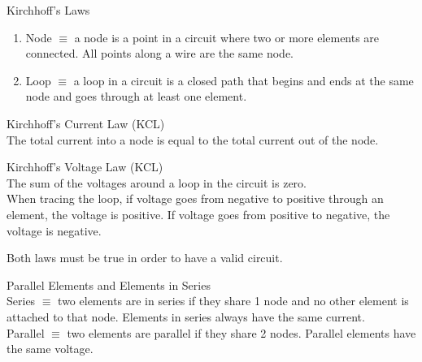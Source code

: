 \documentclass{article}
\begin{document}
\noindent
\Large
Kirchhoff's Laws\\
\normalsize
\noindent
\begin{enumerate}
  \item {
  Node $\equiv$ a node is a point in a circuit where two or more elements are connected. All points along a wire are the same node.
  }
  \item {
  Loop $\equiv$ a loop in a circuit is a closed path that begins and ends at the same node and goes through at least one element.
  }
\end{enumerate}

\noindent
Kirchhoff's Current Law (KCL)\\
\indent
The total current into a node is equal to the total current out of the node.

\noindent
Kirchhoff's Voltage Law (KCL)\\
\indent
The sum of the voltages around a loop in the circuit is zero.\\
When tracing the loop, if voltage goes from negative to positive through an element, the voltage is positive. If voltage goes from positive to negative, the voltage is negative.

\noindent
Both laws must be true in order to have a valid circuit.

\noindent
\Large
Parallel Elements and Elements in Series\\
\normalsize
\noindent
Series $\equiv$ two elements are in series if they share 1 node and no other element is attached to that node. Elements in series always have the same current.\\
Parallel $\equiv$ two elements are parallel if they share 2 nodes. Parallel elements have the same voltage.
\end{document}

